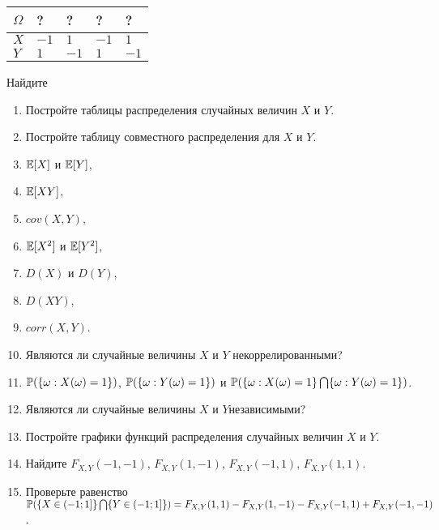 \begin{tabular}{|p{0.3in}|p{0.3in}|p{0.3in}|p{0.3in}|p{0.3in}|} \hline 
$\Omega $ & ? & ? & ? & ? \\ \hline 
$X$ & $-1$ & $1$ & $-1$ & $1$ \\ \hline 
$Y$ & $1$ & $-1$ & $1$ & $-1$ \\ \hline 
\end{tabular}

Найдите

\begin{enumerate}
\item  Постройте таблицы распределения случайных величин $X$ и $Y$.

\item  Постройте таблицу совместного распределения для $X$ и $Y$.

\item  ${\rm {\mathbb E}}[X]$ и ${\rm {\mathbb E}}[Y]$,

\item  ${\rm {\mathbb E}}[XY]$,

\item  $cov(X,Y)$,

\item  ${\rm {\mathbb E}}[X^{2} ]$ и ${\rm {\mathbb E}}[Y^{2} ]$,

\item  $D(X)$ и $D(Y)$,

\item  $D(XY)$,

\item  $corr(X,Y)$.

\item  Являются ли случайные величины $X$ и $Y$ некоррелированными?

\item  ${\rm {\mathbb P}}(\{ \omega :X(\omega )=1\} )$, ${\rm {\mathbb P}}(\{ \omega :Y(\omega )=1\} )$ и ${\rm {\mathbb P}}(\{ \omega :X(\omega )=1\} \bigcap \{ \omega :Y(\omega )=1\} )$.

\item  Являются ли случайные величины  $X$ и $Y$независимыми?

\item  Постройте графики функций распределения случайных величин $X$ и $Y$.

\item  Найдите $F_{X,Y} (-1,-1)$, $F_{X,Y} (1,-1)$, $F_{X,Y} (-1,1)$, $F_{X,Y} (1,1)$.

\item  Проверьте равенство ${\rm {\mathbb P}}(\{ X\in (-1;1]\} \bigcap \{ Y\in (-1;1]\} )=F_{X,Y} (1,1)-F_{X,Y} (1,-1)-F_{X,Y} (-1,1)+F_{X,Y} (-1,-1)$.
\end{enumerate}

